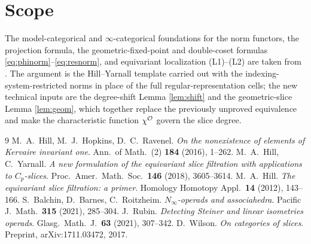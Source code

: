 \section*{Scope}

The model-categorical and $\infty$-categorical foundations for the
norm functors, the projection formula, the geometric-fixed-point and double-coset
formulas \eqref{eq:phinorm}--\eqref{eq:resnorm}, and equivariant localization
(L1)--(L2) are taken from \cite{HHR16, HillPrimer, BBR, Rubin}. The argument is the
Hill--Yarnall template \cite{HY18} carried out with the
indexing-system-restricted norms in place of the full regular-representation
cells; the new technical inputs are the degree-shift Lemma \ref{lem:shift} and the
geometric-slice Lemma \ref{lem:geom}, which together replace the previously
unproved equivalence and make the characteristic function $\chi^{\mathcal{O}}$ govern the
slice degree.

\begin{thebibliography}{9}
 M.~A.~Hill, M.~J.~Hopkins, D.~C.~Ravenel.
  \emph{On the nonexistence of elements of Kervaire invariant one}.
  Ann.\ of Math.\ (2) \textbf{184} (2016), 1--262.
 M.~A.~Hill, C.~Yarnall.
  \emph{A new formulation of the equivariant slice filtration with applications
  to $C_p$-slices}. Proc.\ Amer.\ Math.\ Soc.\ \textbf{146} (2018), 3605--3614.
 M.~A.~Hill.
  \emph{The equivariant slice filtration: a primer}.
  Homology Homotopy Appl.\ \textbf{14} (2012), 143--166.
 S.~Balchin, D.~Barnes, C.~Roitzheim.
  \emph{$N_\infty$-operads and associahedra}.
  Pacific J.\ Math.\ \textbf{315} (2021), 285--304.
 J.~Rubin.
  \emph{Detecting Steiner and linear isometries operads}.
  Glasg.\ Math.\ J.\ \textbf{63} (2021), 307--342.
 D.~Wilson.
  \emph{On categories of slices}. Preprint, arXiv:1711.03472, 2017.
\end{thebibliography}

\endgroup